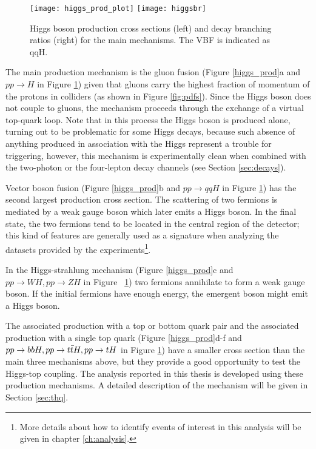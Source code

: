 \begin{figure}[!h]
\centering
\texttt{[image: higgs\_prod\_plot]}
\texttt{[image: higgsbr]}
\caption[Higgs boson production cross section and decay branching ratios]{Higgs boson production cross sections (left) and decay branching ratios (right) for the main mechanisms. The VBF is indicated as qqH\cite{hcswg}.}
\label{hcs_br}
\end{figure}


The main production mechanism is the gluon fusion (Figure \ref{higgs_prod}a and $pp\to H$ in Figure \ref{hcs_br}) given that gluons carry the highest fraction of momentum of the protons in \pp colliders (as shown in Figure \ref{fig:pdfs}). Since the Higgs boson does not couple to gluons, the mechanism proceeds through the exchange of a virtual top-quark loop. Note that in this process the Higgs boson is produced alone, turning out to be problematic for some Higgs decays, because such absence of anything produced in association with the Higgs represent a trouble for triggering, however, this mechanism is experimentally clean when combined with the two-photon or the four-lepton decay channels (see Section \ref{sec:decays}). 

Vector boson fusion (Figure \ref{higgs_prod}b and $pp\to qqH$ in Figure \ref{hcs_br}) has the second largest production cross section. The scattering of two fermions is mediated by a weak gauge boson which later emits a Higgs boson. In the final state, the two fermions tend to be located in the central region of the detector; this kind of features are generally used as a signature when analyzing the datasets provided by the experiments\footnote{More details about how to identify events of interest in this analysis will be given in chapter \ref{ch:analysis}.}. 

In the Higgs-strahlung mechanism (Figure \ref{higgs_prod}c and ~$pp\to WH, pp\to ZH$ in Figure ~\ref{hcs_br}) two fermions annihilate to form a weak gauge boson. If the initial fermions have enough energy, the emergent boson might emit a Higgs boson.

The associated production with a top or bottom quark pair and the associated production with a single top quark (Figure \ref{higgs_prod}d-f and ~$pp\to bbH, pp\to t\bar{t}H, pp\to tH$ in Figure \ref{hcs_br}) have a smaller cross section than the main three mechanisms above, but they provide a good opportunity to test the Higgs-top coupling. The analysis reported in this thesis is developed using these production mechanisms. A detailed description of the \tH mechanism will be given in Section \ref{sec:thq}.  

